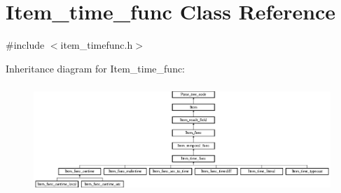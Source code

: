 \hypertarget{classItem__time__func}{}\section{Item\+\_\+time\+\_\+func Class Reference}
\label{classItem__time__func}


{\ttfamily \#include $<$item\+\_\+timefunc.\+h$>$}

Inheritance diagram for Item\+\_\+time\+\_\+func\+:\begin{figure}[H]
\begin{center}
\leavevmode
\includegraphics[height=4.102564cm]{classItem__time__func}
\end{center}
\end{figure}
